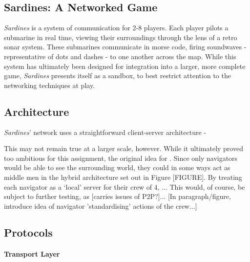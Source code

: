 \documentclass[a4paper, 10pt]{article}
\begin{document}
\graphicspath{{./Images/}}
\begin{flushleft}

\section*{Sardines: A Networked Game}

\textit{Sardines} is a system of communication for 2-8 players. Each player pilots a submarine in real time, viewing their surroundings through the lens of a retro sonar system. These submarines communicate in morse code, firing soundwaves - representative of dots and dashes - to one another across the map. While this system has ultimately been designed for integration into a larger, more complete game, \textit{Sardines} presents itself as a sandbox, to best restrict attention to the networking techniques at play.

\subsection*{Architecture}\label{Architecture}

\textit{Sardines}' network uses a straightforward client-server architecture - 

\vspace{5pt}\noindent
This may not remain true at a larger scale, however. While it ultimately proved too ambitious for this assignment, the original idea for . Since only navigators would be able to see the surrounding world, they could in some ways act as middle men in the hybrid architecture set out in Figure [FIGURE]. By treating each navigator as a `local' server for their crew of $4$, ...
This would, of course, be subject to further testing, as [carries issues of P2P?]...
[In paragraph/figure, introduce idea of navigator 'standardising' actions of the crew...]

\vspace{5pt}

\subsection*{Protocols}

\paragraph{Transport Layer}


\end{flushleft}
\end{document}

